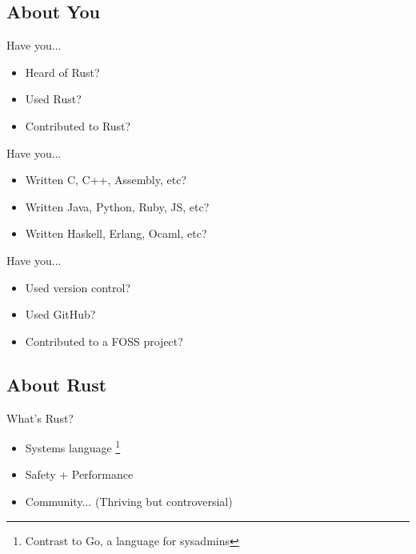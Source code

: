 \documentclass[50pt]{beamer}
\begin{document}
    \subsection{About You}

    \begin{frame}
        Have you...
        \begin{itemize}
            \item Heard of Rust?
            \item Used Rust?
            \item Contributed to Rust?
        \end{itemize}
    \end{frame}

    \begin{frame}
        Have you...
        \begin{itemize}
            \item Written C, C++, Assembly, etc?
            \item Written Java, Python, Ruby, JS, etc?
            \item Written Haskell, Erlang, Ocaml, etc?
        \end{itemize}
    \end{frame}

    \begin{frame}
        Have you...
        \begin{itemize}
            \item Used version control?
            \item Used GitHub?
            \item Contributed to a FOSS project?
        \end{itemize}
    \end{frame}

    \subsection{About Rust}

    \begin{frame}
        What's Rust?
        \begin{itemize}
            \item Systems language \footnote{Contrast to Go, a language for sysadmins}
            \item Safety + Performance
            \item Community... (Thriving but controversial)
        \end{itemize}
    \end{frame}
\end{document}

